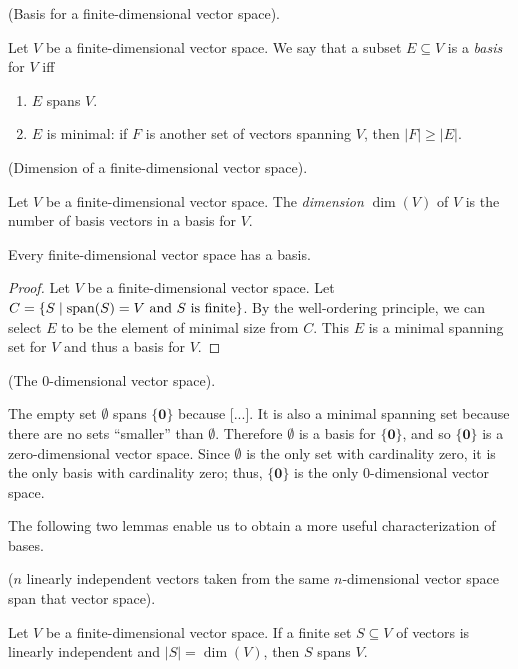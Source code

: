 \begin{defn}
    (Basis for a finite-dimensional vector space). 
    
    Let $V$ be a finite-dimensional vector space. We say that a subset $E \subseteq V$ is a \textit{basis} for $V$ iff
    
    \begin{enumerate}
        \item $E$ spans $V$.
        \item $E$ is minimal: if $F$ is another set of vectors spanning $V$, then $|F| \geq |E|$.
    \end{enumerate}
\end{defn}

\begin{defn}
    (Dimension of a finite-dimensional vector space).
    
    Let $V$ be a finite-dimensional vector space. The \textit{dimension} $\dim(V)$ of $V$ is the number of basis vectors in a basis for $V$.
\end{defn}

\begin{theorem}
    Every finite-dimensional vector space has a basis.
\end{theorem}

\begin{proof}
    Let $V$ be a finite-dimensional vector space. Let $C = \{S \mid \text{span}(S) = V \text{ and $S$ is finite} \}$. By the well-ordering principle, we can select $E$ to be the element of minimal size from $C$. This $E$ is a minimal spanning set for $V$ and thus a basis for $V$.
\end{proof}

\begin{remark}
\label{ch::lin_alg::rmk::zero_dim_vector_space}
    (The $0$-dimensional vector space). 
    
    The empty set $\emptyset$ spans $\{\mathbf{0}\}$ because [...]. It is also a minimal spanning set because there are no sets ``smaller'' than $\emptyset$. Therefore $\emptyset$ is a basis for $\{\mathbf{0}\}$, and so $\{\mathbf{0}\}$ is a zero-dimensional vector space. Since $\emptyset$ is the only set with cardinality zero, it is the only basis with cardinality zero; thus, $\{\mathbf{0}\}$ is the only $0$-dimensional vector space.
\end{remark}

The following two lemmas enable us to obtain a more useful characterization of bases.

\begin{lemma}
\label{ch::lin_alg::lemma::n_lin_indep_vectors_span_n_dim_space}
    ($n$ linearly independent vectors taken from the same $n$-dimensional vector space span that vector space).

    Let $V$ be a finite-dimensional vector space. If a finite set $S \subseteq V$ of vectors is linearly independent and $|S| = \dim(V)$, then $S$ spans $V$.
\end{lemma}

